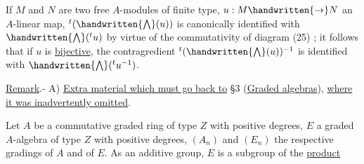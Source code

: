 If $M$ and $N$ are two free $A$-modules of finite type, $u:M\handwritten{\to}N$ an $A$-linear map, ${}^{t}(\handwritten{\bigwedge}(u))$ is canonically identified with $\handwritten{\bigwedge}({}^{t}u)$ by virtue of the commutativity of diagram (25) ; it follows that if $u$ is \uline{bijective}, the contragredient ${}^{t}(\handwritten{\bigwedge}(u))^{-1}$ is identified with $\handwritten{\bigwedge}({}^{t}u^{-1})$.

\uline{Remark}.- A) \uline{Extra material which must go back to} \S3 (\uline{Graded algebras}), \uline{where it was inadvertently omitted}.

Let $A$ be a commutative graded ring of type $Z$ with positive degrees, $E$ a graded $A$-algebra of type $Z$ with positive degrees, $(A_n)$ and $(E_n)$ the respective gradings of $A$ and of $E$. As an additive group, $E$ is a subgroup of the \uline{product}
